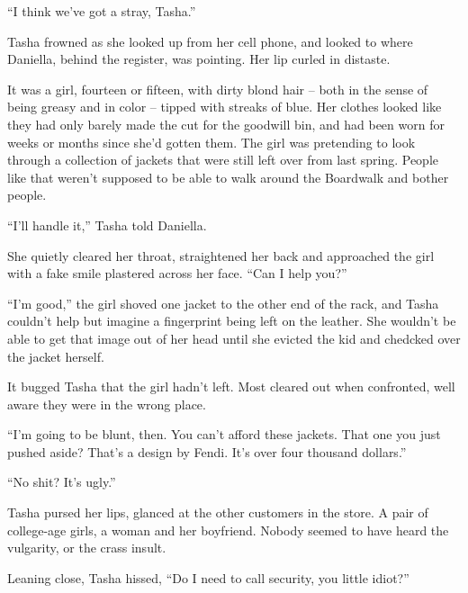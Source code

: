 





``I think we've got a stray, Tasha.''



Tasha frowned as she looked up from her cell phone, and looked to where Daniella, behind the register, was pointing.  Her lip curled in distaste.



It was a girl, fourteen or fifteen, with dirty blond hair – both in the sense of being greasy and in color – tipped with streaks of blue.  Her clothes looked like they had only barely made the cut for the goodwill bin, and had been worn for weeks or months since she'd gotten them.  The girl was pretending to look through a collection of jackets that were still left over from last spring.  People like that weren't supposed to be able to walk around the Boardwalk and bother people.



``I'll handle it,'' Tasha told Daniella.



She quietly cleared her throat, straightened her back and approached the girl with a fake smile plastered across her face.  ``Can I help you?''



``I'm good,'' the girl shoved one jacket to the other end of the rack, and Tasha couldn't help but imagine a fingerprint being left on the leather.  She wouldn't be able to get that image out of her head until she evicted the kid and chedcked over the jacket herself.



It bugged Tasha that the girl hadn't left.  Most cleared out when confronted, well aware they were in the wrong place.



``I'm going to be blunt, then.  You can't afford these jackets.  That one you just pushed aside?  That's a design by Fendi.  It's over four thousand dollars.''



``No shit?  It's ugly.''



Tasha pursed her lips, glanced at the other customers in the store.  A pair of college-age girls, a woman and her boyfriend.  Nobody seemed to have heard the vulgarity, or the crass insult.



Leaning close, Tasha hissed, ``Do I need to call security, you little idiot?''



